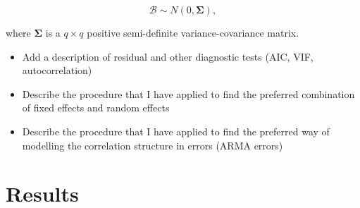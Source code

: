\documentclass[a4paper,12pt]{article}
\begin{document}
\begin{equation}\label{ranefDist}
\mathscr{B} \sim \mathit{N}(0,\mathbf{\Sigma}),
\end{equation}

where $\mathbf{\Sigma}$ is a $q \times q$ positive semi-definite variance-covariance matrix.

\color{blue}
\begin{itemize}
\item Add a description of residual and other diagnostic tests (AIC, VIF, autocorrelation)
\item Describe the procedure that I have applied to find the preferred combination of fixed effects and random effects
\item Describe the procedure that I have applied to find the preferred way of modelling the  correlation structure in errors (ARMA errors)
\end{itemize}
\color{black}
\FloatBarrier




\section{Results}\label{Results}
\end{document}
